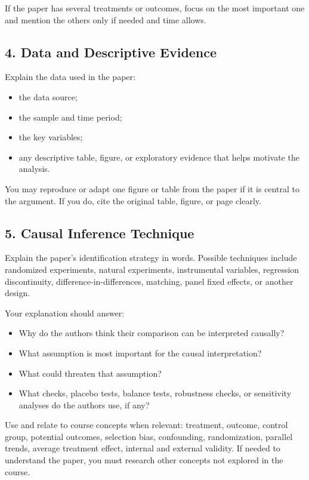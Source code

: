 \documentclass[12pt]{article}
\begin{document}
If the paper has several treatments or outcomes, focus on the most important one and mention the others only if needed and time allows.

\subsection*{4. Data and Descriptive Evidence}

Explain the data used in the paper:

\begin{itemize}
    \item the data source;
    \item the sample and time period;
    \item the key variables;
    \item any descriptive table, figure, or exploratory evidence that helps motivate the analysis.
\end{itemize}

You may reproduce or adapt one figure or table from the paper if it is central to the argument. If you do, cite the original table, figure, or page clearly.

\subsection*{5. Causal Inference Technique}

Explain the paper's identification strategy in words. 
Possible techniques include randomized experiments, natural experiments, instrumental variables, regression discontinuity, difference-in-differences, matching, panel fixed effects, or another design.

Your explanation should answer:

\begin{itemize}
    \item Why do the authors think their comparison can be interpreted causally?
    \item What assumption is most important for the causal interpretation?
    \item What could threaten that assumption?
    \item What checks, placebo tests, balance tests, robustness checks, or sensitivity analyses do the authors use, if any?
\end{itemize}

Use and relate to course concepts when relevant: treatment, outcome, control group, potential outcomes, selection bias, confounding, randomization, parallel trends, average treatment effect, internal and external validity.
If needed to understand the paper, you must research other concepts not explored in the course.
\end{document}
